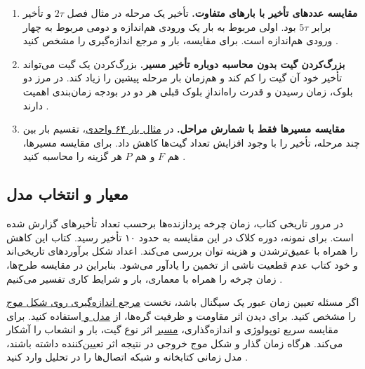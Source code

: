 \begin{enumerate}
  \item \textbf{مقایسه عددهای تأخیر با بارهای متفاوت.}
    تأخیر یک مرحله  در مثال فصل \(2\tau\)
    و تأخیر  برابر \(5\tau\) بود. اولی مربوط به
    بار یک ورودی هم‌اندازه و دومی مربوط به چهار ورودی هم‌اندازه
    است. برای مقایسه، بار و مرجع اندازه‌گیری را مشخص کنید
    \cite[بخش ، صفحات ۱۷۴ و ۱۷۵]{weste}.
  \item \textbf{بزرگ‌کردن گیت بدون محاسبه دوباره تأخیر مسیر.}
    بزرگ‌کردن یک گیت می‌تواند تأخیر خود آن گیت را کم کند و
    هم‌زمان بار مرحله پیشین را زیاد کند. در مرز دو بلوک،
    زمان رسیدن و قدرت راه‌اندازِ بلوک قبلی هر دو در
    بودجه زمان‌بندی اهمیت دارند
    \cite[بخش ، صفحه ۱۷۵]{weste}.
  \item \textbf{مقایسه مسیرها فقط با شمارش مراحل.}
    در \hyperref[sec:delay-path-stage-count]{مثال بار ۶۴ واحدی}،
    تقسیم بار بین چند مرحله، تأخیر را با وجود افزایش تعداد
    گیت‌ها کاهش داد. برای مقایسه مسیرها، هم \(F\) و هم \(P\)
    هر گزینه را محاسبه کنید
    \cite[بخش ، صفحه ۱۷۵]{weste}.
\end{enumerate}

\subsection{معیار  و انتخاب مدل}
\label{sec:delay-model-selection}

در مرور تاریخی کتاب، زمان چرخه پردازنده‌ها برحسب تعداد
تأخیرهای  گزارش شده است. برای نمونه، دوره کلاک
 در این مقایسه به حدود ۱۰ تأخیر 
رسید. کتاب این کاهش را همراه با عمیق‌ترشدن  و
هزینه توان بررسی می‌کند. اعداد شکل  برآوردهای
تاریخی‌اند و خود کتاب عدم قطعیت ناشی از تخمین 
را یادآور می‌شود. بنابراین در مقایسه طرح‌ها، زمان چرخه را
همراه با معماری، بار و شرایط کاری تفسیر می‌کنیم
\cite[بخش ، شکل ،
صفحات ۱۷۵ و ۱۷۶]{weste}.

اگر مسئله تعیین زمان عبور یک سیگنال باشد، نخست
\hyperref[sec:delay-waveform]{مرجع اندازه‌گیری روی شکل موج}
را مشخص کنید. برای دیدن اثر مقاومت و ظرفیت گره‌ها، از
\hyperref[sec:delay-elmore]{مدل  و }
استفاده کنید. برای مقایسه سریع توپولوژی و اندازه‌گذاری،
\hyperref[sec:delay-path-model]{ مسیر}
اثر نوع گیت، بار و انشعاب را آشکار می‌کند. هرگاه زمان گذار
و شکل موج خروجی در نتیجه اثر تعیین‌کننده داشته باشند،
مدل زمانی کتابخانه و شبکه اتصال‌ها را در تحلیل وارد کنید
\cite[جمع‌بندی فصل ، صفحه ۱۷۶]{weste}.

